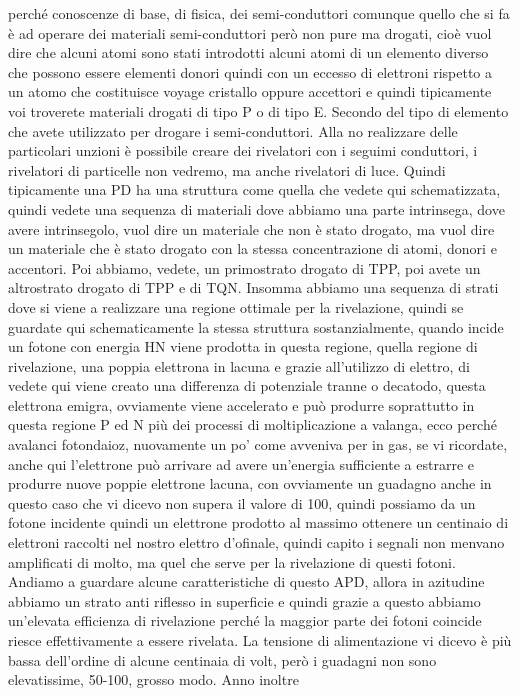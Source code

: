 {perché conoscenze di base, di fisica, dei semi-conduttori comunque quello che si fa è ad operare dei materiali semi-conduttori però non pure ma drogati, cioè vuol dire che alcuni atomi sono stati introdotti alcuni atomi di un elemento diverso che possono essere elementi donori quindi con un eccesso di elettroni rispetto a un atomo che costituisce voyage cristallo oppure accettori e quindi tipicamente voi troverete materiali drogati di tipo P o di tipo E. Secondo del tipo di elemento che avete utilizzato per drogare i semi-conduttori. Alla no realizzare delle particolari unzioni è possibile creare dei rivelatori con i seguimi conduttori, i rivelatori di particelle non vedremo, ma anche rivelatori di luce. Quindi tipicamente una PD ha una struttura come quella che vedete qui schematizzata, quindi vedete una sequenza di materiali dove abbiamo una parte intrinsega, dove avere intrinsegolo, vuol dire un materiale che non è stato drogato, ma vuol dire un materiale che è stato drogato con la stessa concentrazione di atomi, donori e accentori. Poi abbiamo, vedete, un primostrato drogato di TPP, poi avete un altrostrato drogato di TPP e di TQN. Insomma abbiamo una sequenza di strati dove si viene a realizzare una regione ottimale per la rivelazione, quindi se guardate qui schematicamente la stessa struttura sostanzialmente, quando incide un fotone con energia HN viene prodotta in questa regione, quella regione di rivelazione, una poppia elettrona in lacuna e grazie all'utilizzo di elettro, di vedete qui viene creato una differenza di potenziale tranne o decatodo, questa elettrona emigra, ovviamente viene accelerato e può produrre soprattutto in questa regione P ed N più dei processi di moltiplicazione a valanga, ecco perché avalanci fotondaioz, nuovamente un po' come avveniva per in gas, se vi ricordate, anche qui l'elettrone può arrivare ad avere un'energia sufficiente a estrarre e produrre nuove poppie elettrone lacuna, con ovviamente un guadagno anche in questo caso che vi dicevo non supera il valore di 100, quindi possiamo da un fotone incidente quindi un elettrone prodotto al massimo ottenere un centinaio di elettroni raccolti nel nostro elettro d'ofinale, quindi capito i segnali non menvano amplificati di molto, ma quel che serve per la rivelazione di questi fotoni. Andiamo a guardare alcune caratteristiche di questo APD, allora in azitudine abbiamo un strato anti riflesso in superficie e quindi grazie a questo abbiamo un'elevata efficienza di rivelazione perché la maggior parte dei fotoni coincide riesce effettivamente a essere rivelata. La tensione di alimentazione vi dicevo è più bassa dell'ordine di alcune centinaia di volt, però i guadagni non sono elevatissime, 50-100, grosso modo. Anno inoltre 

}
